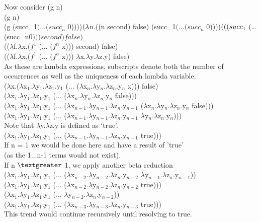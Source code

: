 \documentclass{jhwhw}
\begin{document}
	\bigbreak
	Now consider (g n) \\
	(g n) \\
	(g (succ_1$ (\ldots (succ_n$ 0))))$ \\
	(\lambda $n.((n second) false) (succ_1$ (\ldots (succ_n$ 0))))$ \\
	(((succ_1$ (\ldots (succ_n$ 0))) second) false)$ \\
	(($\lambda$f.$\lambda$x.($f^1$ ($\ldots$ ($f^n$ x))) second) false)\\
	(($\lambda$f.$\lambda$x.($f^1$ ($\ldots$ ($f^n$ x))) $\lambda$x.$\lambda$y.$\lambda$z.y) false)\\
	As these are lambda expressions, subscripts denote both the number of occurrences as well as 
	the uniqueness of each lambda variable. \\
	($\lambda$x.($\lambda$x$_1$.$\lambda$y$_1$.$\lambda$z$_1$.y$_1$ 
		($\ldots$ ($\lambda$x$_n$.$\lambda$y$_n$.$\lambda$z$_n$.y$_n$ x))) false) \\
	($\lambda$x$_1$.$\lambda$y$_1$.$\lambda$z$_1$.y$_1$ 
		($\ldots$ ($\lambda$x$_n$.$\lambda$y$_n$.$\lambda$z$_n$.y$_n$ false))) \\
	($\lambda$x$_1$.$\lambda$y$_1$.$\lambda$z$_1$.y$_1$ ($\ldots$ 
		($\lambda$x$_{n-1}$.$\lambda$y$_{n-1}$.$\lambda$z$_n$.y$_{n-1}$ 
		($\lambda$x$_n$.$\lambda$y$_n$.$\lambda$z$_n$.y$_n$ 
		false))) \\
	($\lambda$x$_1$.$\lambda$y$_1$.$\lambda$z$_1$.y$_1$ ($\ldots$ 
		($\lambda$x$_{n-1}$.$\lambda$y$_{n-1}$.$\lambda$z$_n$.y$_{n-1}$ 
		$\lambda$y$_n$.$\lambda$z$_n$.y$_n$))) \\
	Note that $\lambda$y.$\lambda$z.y is defined as `true'. \\
	($\lambda$x$_1$.$\lambda$y$_1$.$\lambda$z$_1$.y$_1$ ($\ldots$ 
		($\lambda$x$_{n-1}$.$\lambda$y$_{n-1}$.$\lambda$z$_n$.y$_{n-1}$ 
		true))) \\
	If n = 1 we would be done here and have a result of 'true' \\ (as the 1$\ldots$n-1 terms would not exist). \\
	If n $\textgreater$ 1, we apply another beta reduction \\
	($\lambda$x$_1$.$\lambda$y$_1$.$\lambda$z$_1$.y$_1$ ($\ldots$ 
		($\lambda$x$_{n-2}$.$\lambda$y$_{n-2}$.$\lambda$z$_n$.y$_{n-2}$ 
		$\lambda$y$_{n-1}$.$\lambda$z$_n$.y$_{n-1}$)) \\
	($\lambda$x$_1$.$\lambda$y$_1$.$\lambda$z$_1$.y$_1$ ($\ldots$ 
		($\lambda$x$_{n-2}$.$\lambda$y$_{n-2}$.$\lambda$z$_n$.y$_{n-2}$ 
		true))) \\
	($\lambda$x$_1$.$\lambda$y$_1$.$\lambda$z$_1$.y$_1$ ($\ldots$ 
		$\lambda$y$_{n-2}$.$\lambda$z$_n$.y$_{n-2}$)) \\
	($\lambda$x$_1$.$\lambda$y$_1$.$\lambda$z$_1$.y$_1$ ($\ldots$ 
		($\lambda$x$_{n-3}$.$\lambda$y$_{n-3}$.$\lambda$z$_n$.y$_{n-3}$ 
		true))) \\
	This trend would continue recursively until resolving to true. \\
\end{document}
